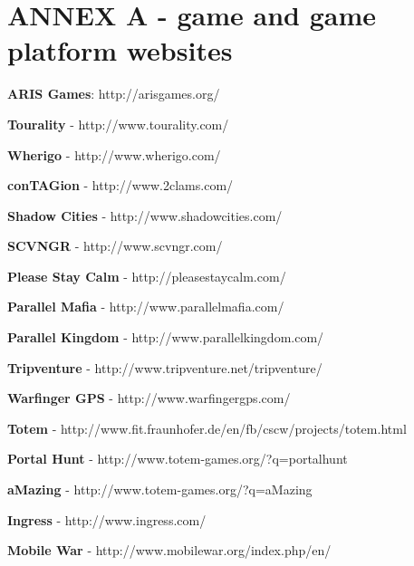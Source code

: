 \documentclass{article}
\begin{document}
\section{ANNEX A - game and game platform websites}



\nocite{teamtags}
\nocite{gps1}



\textbf{ARIS Games}: http://arisgames.org/ \newline

\textbf{Tourality} - http://www.tourality.com/ \newline

\textbf{Wherigo} - http://www.wherigo.com/ \newline

\textbf{conTAGion} - http://www.2clams.com/ \newline

\textbf{Shadow Cities} - http://www.shadowcities.com/ \newline

\textbf{SCVNGR} - http://www.scvngr.com/ \newline

\textbf{Please Stay Calm} - http://pleasestaycalm.com/ \newline

\textbf{Parallel Mafia} - http://www.parallelmafia.com/ \newline

\textbf{Parallel Kingdom} - http://www.parallelkingdom.com/ \newline

\textbf{Tripventure} - http://www.tripventure.net/tripventure/ \newline

\textbf{Warfinger GPS} - http://www.warfingergps.com/ \newline

\textbf{Totem} - http://www.fit.fraunhofer.de/en/fb/cscw/projects/totem.html
\newline

\textbf{Portal Hunt} - http://www.totem-games.org/?q=portalhunt \newline

\textbf{aMazing} - http://www.totem-games.org/?q=aMazing \newline

\textbf{Ingress} - http://www.ingress.com/ \newline

\textbf{Mobile War} - http://www.mobilewar.org/index.php/en/ \newline
\end{document}
